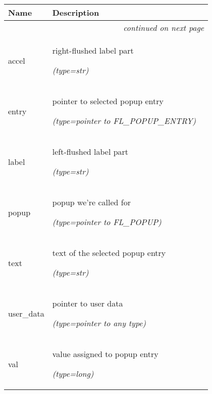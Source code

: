     \vspace{-1cm}
\hspace{\varindent}\begin{longtable}{|p{\varnamewidth}|p{\vardescrwidth}|l}
\cline{1-2}
\cline{1-2} \centering \textbf{Name} & \centering \textbf{Description}& \\
\cline{1-2}
\endhead\cline{1-2}\multicolumn{3}{r}{\small\textit{continued on next page}}\\\endfoot\cline{1-2}
\endlastfoot\raggedright a\-c\-c\-e\-l\- & \raggedright right-flushed label part

            {\it (type=str)}&\\
\cline{1-2}
\raggedright e\-n\-t\-r\-y\- & \raggedright pointer to selected popup entry

            {\it (type=pointer to FL\_POPUP\_ENTRY)}&\\
\cline{1-2}
\raggedright l\-a\-b\-e\-l\- & \raggedright left-flushed label part

            {\it (type=str)}&\\
\cline{1-2}
\raggedright p\-o\-p\-u\-p\- & \raggedright popup we're called for

            {\it (type=pointer to FL\_POPUP)}&\\
\cline{1-2}
\raggedright t\-e\-x\-t\- & \raggedright text of the selected popup entry

            {\it (type=str)}&\\
\cline{1-2}
\raggedright u\-s\-e\-r\-\_\-d\-a\-t\-a\- & \raggedright pointer to user data

            {\it (type=pointer to any type)}&\\
\cline{1-2}
\raggedright v\-a\-l\- & \raggedright value assigned to popup entry

            {\it (type=long)}&\\
\cline{1-2}
\end{longtable}



